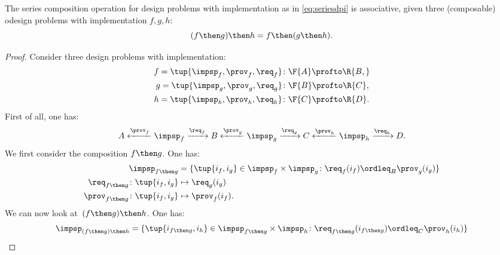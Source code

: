 \begin{lemma}
    The series composition operation for design problems with implementation as in \cref{eq:seriesdpi} is associative, \ie  given three (composable) odesign problems with implementation $f,g,h$:
    \begin{equation}
        (f\then g)
        \then h = f\then (g\then h).
    \end{equation}
\end{lemma}
\begin{proof}
    Consider three design problems with implementation:
    \begin{equation}
        \begin{aligned}
            f=\tup{{\impsp_f, \prov_f, \req_f} } & \colon \F{A} \profto\R{B,} \\
            g=\tup{\impsp_g, \prov_g, \req_g}    & \colon \F{B} \profto \R{C}, \\
            h=\tup{\impsp_h, \prov_h, \req_h}    & \colon \F{C} \profto \R{D}.
        \end{aligned}
    \end{equation}
    First of all, one has:
    \begin{equation}
        A \xleftarrow{\prov_f} \impsp_f \xrightarrow{\req_f} B
        \xleftarrow{\prov_g} \impsp_g \xrightarrow{\req_g} C
        \xleftarrow{\prov_h} \impsp_h \xrightarrow{\req_h} D.
    \end{equation}
    We first consider the composition $f\then g$.
    One has:
    \begin{equation}
        \begin{aligned}
            \impsp_{f\then g}                       & = \{
            \tup{i_f,i_g} \in \impsp_f \times \impsp_g \colon
            \req_f(i_f) \ordleq_{B} \prov_g(i_g)
            \} \\
            \req_{f\then g}  \colon  \tup{i_f,i_g}  & \mapsto \req_g(i_g) \\
            \prov_{f\then g}  \colon  \tup{i_f,i_g} & \mapsto \prov_f(i_f).
        \end{aligned}
    \end{equation}
    We can now look at~$(f\then g)\then h$.
    One has:
    \begin{equation}
        \begin{aligned}
             & \impsp_{(f\then g)\then h} = \{
            \tup{i_{f\then g},i_h} \in \impsp_{f\then g} \times \impsp_{h}\colon
            \req_{f\then g}(i_{f\then g}) \ordleq_{C} \prov_h(i_h)
            \} \\

\end{aligned}
\end{equation}
\end{proof}
